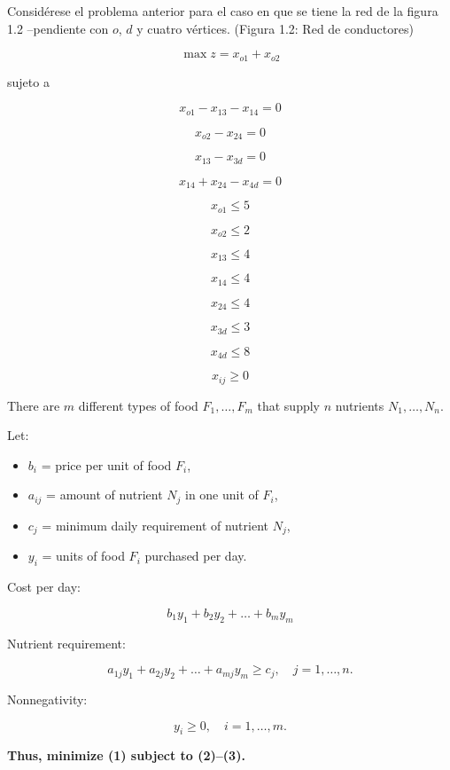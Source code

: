 \begin{Ejem}
Consid\'erese el problema anterior para el caso en que se tiene la red de la figura 1.2 --pendiente con $o$, $d$ y cuatro v\'ertices. (Figura 1.2: Red de conductores)

\begin{tcolorbox}[title=El modelo queda:]
\[
\max z = x_{o1} + x_{o2}
\]

sujeto a

\[
x_{o1} - x_{13} - x_{14} = 0
\]

\[
x_{o2} - x_{24} = 0
\]

\[
x_{13} - x_{3d} = 0
\]

\[
x_{14} + x_{24} - x_{4d} = 0
\]

\[
x_{o1} \le 5
\]

\[
x_{o2} \le 2
\]

\[
x_{13} \le 4
\]

\[
x_{14} \le 4
\]

\[
x_{24} \le 4
\]

\[
x_{3d} \le 3
\]

\[
x_{4d} \le 8
\]

\[
x_{ij} \ge 0
\]
\end{tcolorbox}
\end{Ejem}

\begin{Ejem}

There are $m$ different types of food $F_1,\dots,F_m$ that supply $n$ nutrients
$N_1,\dots,N_n$.

Let:
\begin{itemize}
\item $b_i$ = price per unit of food $F_i$,
\item $a_{ij}$ = amount of nutrient $N_j$ in one unit of $F_i$,
\item $c_j$ = minimum daily requirement of nutrient $N_j$,
\item $y_i$ = units of food $F_i$ purchased per day.
\end{itemize}

Cost per day:

\[
b_1 y_1 + b_2 y_2 + \dots + b_m y_m
\tag{1}
\]

Nutrient requirement:

\[
a_{1j}y_1 + a_{2j}y_2 + \dots + a_{mj}y_m \ge c_j,
\quad j = 1,\dots,n.
\tag{2}
\]

Nonnegativity:

\[
y_i \ge 0, \quad i=1,\dots,m.
\tag{3}
\]

\textbf{Thus, minimize (1) subject to (2)–(3).}
\end{Ejem}


